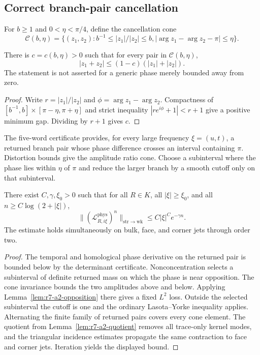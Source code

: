 \subsection{Correct branch-pair cancellation}

For $b\ge1$ and $0<\eta<\pi/4$, define the cancellation cone
\[
 \mathcal C(b,\eta)=
 \{(z_1,z_2):b^{-1}\le |z_1|/|z_2|\le b,
   |\arg z_1-\arg z_2-\pi|\le\eta\}.
\]

\begin{lemma}
\label{lem:r7-a2-opposition}
There is $c=c(b,\eta)>0$ such that for every pair in
$\mathcal C(b,\eta)$,
\[
 |z_1+z_2|\le(1-c)(|z_1|+|z_2|).
\]
The statement is not asserted for a generic phase merely bounded away from
zero.
\end{lemma}

\begin{proof}
Write $r=|z_1|/|z_2|$ and $\phi=\arg z_1-\arg z_2$.  Compactness of
$[b^{-1},b]\times[\pi-\eta,\pi+\eta]$ and strict inequality
$|re^{i\phi}+1|<r+1$ give a positive minimum gap.  Dividing by $r+1$ gives
$c$.
\end{proof}

The five-word certificate provides, for every large frequency
$\xi=(u,t)$, a returned branch pair whose phase difference crosses an interval
containing $\pi$.  Distortion bounds give the amplitude ratio cone.  Choose a
subinterval where the phase lies within $\eta$ of $\pi$ and reduce the larger
branch by a smooth cutoff only on that subinterval.

\begin{theorem}
\label{thm:r7-a2-dolgopyat}
There exist $C,\gamma,\xi_0>0$ such that for all $R\in K$, all
$|\xi|\ge\xi_0$, and all $n\ge C\log(2+|\xi|)$,
\[
 \|(\mathcal L_{R,i\xi}^{\mathrm{phys}})^n\|_{\mathrm{str}\to\mathrm{wk}}
 \le C|\xi|^C e^{-\gamma n}.
\]
The estimate holds simultaneously on bulk, face, and corner jets through order
two.
\end{theorem}

\begin{proof}
The temporal and homological phase derivative on the returned pair is bounded
below by the determinant certificate.  Nonconcentration selects a subinterval
of definite returned mass on which the phase is near opposition.  The cone
invariance bounds the two amplitudes above and below.  Applying
Lemma~\ref{lem:r7-a2-opposition} there gives a fixed $L^2$ loss.  Outside the
selected subinterval the cutoff is one and the ordinary Lasota--Yorke
inequality applies.  Alternating the finite family of returned pairs covers
every cone element.  The quotient from Lemma~\ref{lem:r7-a2-quotient} removes
all trace-only kernel modes, and the triangular incidence estimates propagate
the same contraction to face and corner jets.  Iteration yields the displayed
bound.
\end{proof}

